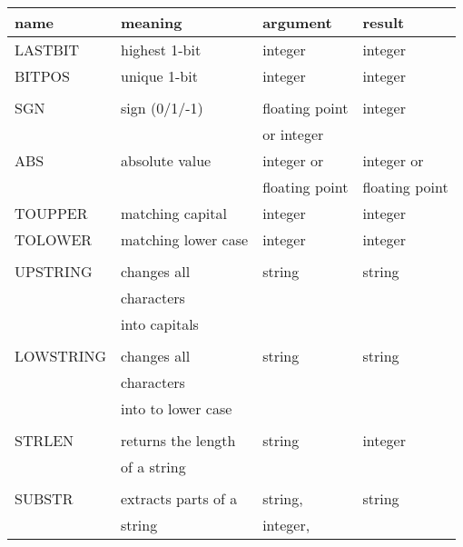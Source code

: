 \documentclass[12pt,twoside]{report}
\begin{document}
\begin{table*}[htbp]
\begin{center}\begin{tabular}{|l|l|l|l|}
\hline
name     & meaning              & argument & result \\
\hline
\hline
LASTBIT  & highest 1-bit        & integer              & integer \\
BITPOS   & unique 1-bit         & integer              & integer \\
         &                      &                      & \\
SGN      & sign (0/1/-1)        & floating point       & integer \\
         &                      & or integer           & \\
ABS      & absolute value       & integer or           & integer or \\
         &                      & floating point       & floating point \\
TOUPPER  & matching capital     & integer              & integer \\
TOLOWER  & matching lower case  & integer              & integer \\
         &                      &                      & \\
UPSTRING & changes all          & string               & string \\
         & characters           &                      & \\
         & into capitals        &                      & \\
         &                      &                      & \\
LOWSTRING & changes all         & string               & string \\
         & characters           &                      & \\
         & into to lower case   &                      & \\
         &                      &                      & \\
STRLEN   & returns the length   & string               & integer \\
         & of a string          &                      & \\
         &                      &                      & \\
SUBSTR   & extracts parts of a  & string,              & string \\
         & string               & integer,             & \\

\end{tabular}
\end{center}
\end{table*}
\end{document}
